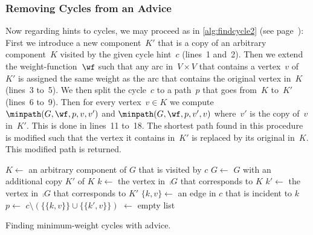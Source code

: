 \subsubsection{Removing Cycles from an Advice}
Now regarding hints to cycles, we may proceed as in \autoref{alg:findcycle2} (see page~\pageref{alg:findcycle2}): First we introduce a new component~$K'$ that is a copy of an arbitrary component~$K$ visited by the given cycle hint~$c$ (lines~1 and~2). Then we extend the weight-function~$\wf$ such that any arc in~$V \times V$ that contains a vertex~$v$ of~$K'$ is assigned the same weight as the arc that contains the original vertex in~$K$ (lines~3 to~5). We then split the cycle~$c$ to a path~$p$ that goes from~$K$ to~$K'$ (lines~6 to~9). Then for every vertex~$v \in K$ we compute~$\minpath(G,\wf,p, v, v')$ and $\minpath(G,\wf,p, v', v)$ where~$v'$ is the copy of~$v$ in~$K'$. This is done in lines~11 to~18. The shortest path found in this procedure is modified such that the vertex it contains in~$K'$ is replaced by its original in~$K$. This modified path is returned.
\begin{algorithm}
  \LinesNumbered
  


  \BlankLine
  $K \leftarrow$ an arbitrary component of $G$ that is visited by $c$\;
  $G \leftarrow$ $G$ with an additional copy $K'$ of $K$\;
  $k \leftarrow$ the vertex in~$\comp{G}$ that corresponds to $K$\;
  $k' \leftarrow$ the vertex in~$\comp{G}$ that corresponds to $K'$\;
  $\{k, v\} \leftarrow$ an edge in $c$ that is incident to $k$\;
  $p \leftarrow$ $c \setminus (\{\{k, v\}\} \cup \{\{k', v\}\})$\;
  \spath $\leftarrow$ empty list\;
  
  
  \caption{Finding minimum-weight cycles with advice.}
  \label{alg:findcycle2}
\end{algorithm}


